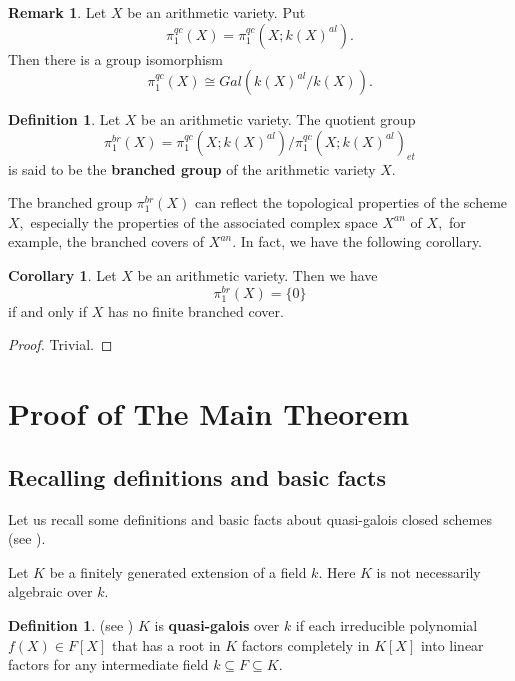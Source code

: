 \documentclass[12pt,twoside,reqno]{amsart}
\theoremstyle{definition}
\newtheorem{definition}[theorem]{Definition}
\newtheorem{remark}[theorem]{Remark}
\newtheorem{corollary}[theorem]{Corollary}
\numberwithin{equation}{section}
\begin{document}
\begin{remark}
Let $X$ be an arithmetic variety. Put $$\pi _{1}^{qc}\left( X \right)=\pi _{1}^{qc}\left( X;{k(X)}^{al} \right).$$ Then there is a group
isomorphism
$$
\pi _{1}^{qc}\left( X \right) \cong Gal\left( {k(X)}^{al}/k\left( X\right)
\right).
$$
\end{remark}

\begin{definition}
Let $X$ be an arithmetic variety. The quotient group
\begin{equation*}
\pi _{1}^{br}\left( X\right) =\pi _{1}^{qc}\left( X;k\left( X\right)
^{al}\right) /\pi _{1}^{qc}\left( X;k\left( X\right) ^{al}\right) _{et}
\end{equation*}
is said to be the \textbf{branched group} of the arithmetic variety $X$.
\end{definition}

The branched group $\pi _{1}^{br}\left( X\right)$ can reflect the
topological properties of the scheme $X,$ especially the properties of the
associated complex space $X^{an}$ of $X,$ for example, the branched covers
of $X^{an}$. In fact, we have the following corollary.

\begin{corollary}
Let $X$ be an arithmetic variety. Then we have
\begin{equation*}
\pi _{1}^{br}\left( X\right)=\{0\}
\end{equation*}
if and only if $X$ has no finite branched cover.
\end{corollary}

\begin{proof}
Trivial.
\end{proof}


\section{Proof of The Main Theorem}

\subsection{Recalling definitions and basic facts}

Let us recall some definitions and basic facts about quasi-galois closed
schemes (see \cite{An2,An3,An4}).

Let $K$ be a finitely generated extension of a field $k$. Here $K$ is not
necessarily algebraic over $k$.

\begin{definition}
(see \cite{An2}) $K$ is \textbf{quasi-galois} over $k$ if each irreducible
polynomial $f(X)\in F[X]$ that has a root in $K$ factors completely in $K\left[ X\right] $ into linear factors for any intermediate field $k\subseteq
F\subseteq K$.
\end{definition}
\end{document}
